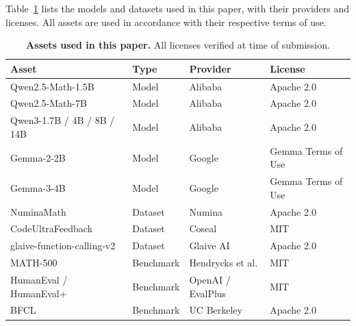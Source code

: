 \documentclass{article}
\begin{document}
Table~\ref{tab:assets_licenses} lists the models and datasets used in this paper, with their providers and licenses. All assets are used in accordance with their respective terms of use.

\begin{table}[h]
\centering
\caption{\textbf{Assets used in this paper.} All licenses verified at time of submission.}
\label{tab:assets_licenses}
\small
\begin{tabular}{llll}
\toprule
\textbf{Asset} & \textbf{Type} & \textbf{Provider} & \textbf{License} \\
\midrule
Qwen2.5-Math-1.5B & Model & Alibaba & Apache 2.0 \\
Qwen2.5-Math-7B & Model & Alibaba & Apache 2.0 \\
Qwen3-1.7B / 4B / 8B / 14B & Model & Alibaba & Apache 2.0 \\
Gemma-2-2B & Model & Google & Gemma Terms of Use \\
Gemma-3-4B & Model & Google & Gemma Terms of Use \\
NuminaMath & Dataset & Numina & Apache 2.0 \\
CodeUltraFeedback & Dataset & Coseal & MIT \\
glaive-function-calling-v2 & Dataset & Glaive AI & Apache 2.0 \\
MATH-500 & Benchmark & Hendrycks et al. & MIT \\
HumanEval / HumanEval+ & Benchmark & OpenAI / EvalPlus & MIT \\
BFCL & Benchmark & UC Berkeley & Apache 2.0 \\
\bottomrule
\end{tabular}
\end{table}


\newpage

\end{document}
